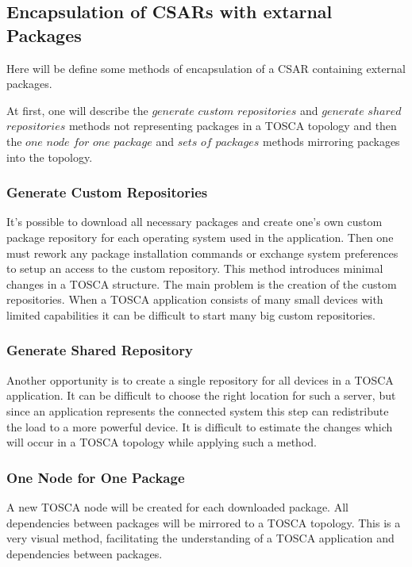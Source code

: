 \subsection*{Encapsulation of CSARs with extarnal Packages}\label{subs:encaps}
Here will be define some methods of encapsulation of a CSAR containing external packages.

At first, one will describe the $generate$ $custom$ $repositories$ and $generate$ $shared$ $repositories$ methods not representing packages in a TOSCA topology and then the $one$ $node$ $for$ $one$ $package$ and $sets$ $of$ $packages$ methods mirroring packages into the topology.
\subsubsection*{Generate Custom Repositories}
It's possible to download all necessary packages and create one's own custom package repository for each operating system used in the application. 
Then one must rework any package installation commands or exchange system preferences to setup an access to the custom repository.
This method introduces minimal changes in a TOSCA structure.
The main problem is the creation of the custom repositories. 
When a TOSCA application consists of many small devices with limited capabilities it can be difficult to start many big custom repositories.
\subsubsection*{Generate Shared Repository}
Another opportunity is to create a single repository for all devices in a TOSCA application.
It can be difficult to choose the right location for such a server, but since an application represents the connected system this step can redistribute the load to a more powerful device.
It is difficult to estimate the changes which will occur in a TOSCA topology while applying such a method.
\subsubsection*{One Node for One Package}
A new TOSCA node will be created for each downloaded package. 
All dependencies between packages will be mirrored to a TOSCA topology.
This is a very visual method, facilitating the understanding of a TOSCA application and dependencies between packages.
